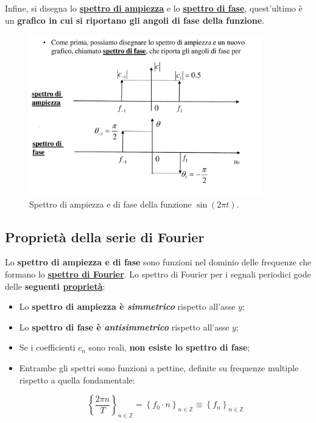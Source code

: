 \documentclass[a4paper]{article}
\begin{document}
	\noindent
	Infine, si disegna lo \textbf{\underline{spettro di ampiezza}} e lo \textbf{\underline{spettro di fase}}, quest'ultimo è un \textbf{grafico in cui si riportano gli angoli di fase della funzione}.
	
	\begin{figure}[!htp]
		\centering
		\includegraphics[width=0.9\textwidth]{img/fourier_spettro_di_ampiezza-e-fase.pdf}
		\caption{Spettro di ampiezza e di fase della funzione $\sin\left(2 \pi t\right)$.}
	\end{figure}

	\newpage
	
	\subsection{Proprietà della serie di Fourier}
	
	\noindent
	Lo \textbf{spettro di ampiezza e di fase} sono funzioni nel dominio delle frequenze che formano lo {\underline{\textcolor{Red3}{\textbf{spettro di Fourier}}}}. Lo spettro di Fourier per i segnali periodici gode delle \textbf{seguenti \underline{proprietà}}:
	
	\begin{itemize}
		\item Lo \textbf{spettro di ampiezza è \emph{simmetrico}} rispetto all'asse $y$;
		
		\item Lo \textbf{spettro di fase è \emph{antisimmetrico}} rispetto all'asse $y$;
		
		\item Se i coefficienti $c_{n}$ sono reali, \textbf{non esiste lo spettro di fase};
		
		\item Entrambe gli spettri sono funzioni a pettine, definite su frequenze multiple rispetto a quella fondamentale:
		
		\begin{equation*}
			\left\{\dfrac{2 \pi n}{T}\right\}_{n \in \mathbb{Z}} = \left\{f_{0} \cdot n\right\}_{n \in \mathbb{Z}} \equiv \left\{f_{n}\right\}_{n \in \mathbb{Z}}
		\end{equation*}
	\end{itemize}
\end{document}
